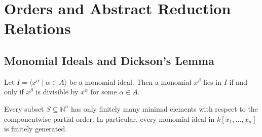 \chapter{Orders and Abstract Reduction Relations} 

\section{Monomial Ideals and Dickson’s Lemma}

\begin{lemma}\label{lem:monomial_ideal}
    Let $I = \langle x^\alpha \mid \alpha \in A \rangle$ be a monomial ideal.
    Then a monomial $x^\beta$ lies in $I$ if and only if $x^\beta$ is divisible by $x^\alpha$ for some $\alpha \in A$.
\end{lemma}

\begin{theorem}\label{thm:Dickson}
    Every subset $S\subseteq \mathbb{N}^n$ has only finitely many minimal elements with respect to the componentwise partial order. 
    In particular, every monomial ideal in $k[x_1,\dots,x_n]$ is finitely generated.
\end{theorem}